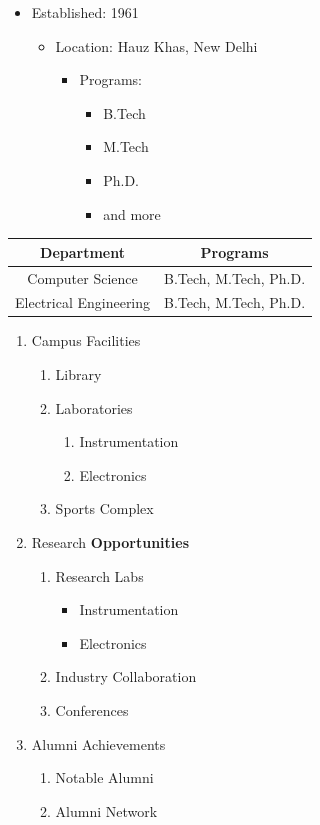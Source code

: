 \documentclass{article}
\begin{document}
\begin{itemize}
    \item Established: 1961
    \begin{itemize}
        \item Location: Hauz Khas, New Delhi
        \begin{itemize}
            \item Programs: 
                \begin{itemize}
                    \item B.Tech
                    \item M.Tech
                    \item Ph.D.
                    \item and more
                \end{itemize}
        \end{itemize}
    \end{itemize}
\end{itemize}


\begin{tabular}{|c|c|}
\hline
Department & Programs \\
\hline
Computer Science & B.Tech, M.Tech, Ph.D. \\
Electrical Engineering & B.Tech, M.Tech, Ph.D. \\
\hline
\end{tabular}


\begin{enumerate}
    \item Campus Facilities
    \begin{enumerate}
        \item Library
        \item Laboratories
        \begin{enumerate}
            \item Instrumentation
            \item Electronics
        \end{enumerate}
        \item Sports Complex
    \end{enumerate}
    \item Research \textbf{Opportunities}
    \begin{enumerate}
        \item Research Labs
        \begin{itemize}
            \item Instrumentation
            \item Electronics
        \end{itemize}
        \item Industry Collaboration
        \item Conferences
    \end{enumerate}
    \item Alumni Achievements
    \begin{enumerate}
        \item Notable Alumni
        \item Alumni Network
    \end{enumerate}
\end{enumerate}
\end{document}
